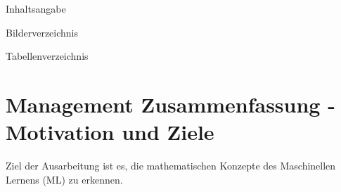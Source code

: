 \documentclass[12pt]{article}
\begin{document}
\begin{titlepage}
  
\end{titlepage}

\begin{LARGE} Inhaltsangabe \end{LARGE}

\tableofcontents

\newpage

\begin{LARGE} Bilderverzeichnis \end{LARGE}

\listoffigures 

\newpage

\begin{LARGE} Tabellenverzeichnis \end{LARGE}

\listoftables 

\newpage

\printindex

\newpage

 
\renewcommand{\labelenumi}{(\alph{enumi})}
\renewcommand{\labelenumii}{\arabic{enumii}.}

\fancyfoot[C]{--- \thepage/\pageref{LastPage}\ ---}

\section{Management Zusammenfassung - Motivation und Ziele}

Ziel der Ausarbeitung ist es, die {\color{blue}mathematischen Konzepte des Maschinellen Lernens (ML)} zu erkennen.
\end{document}
